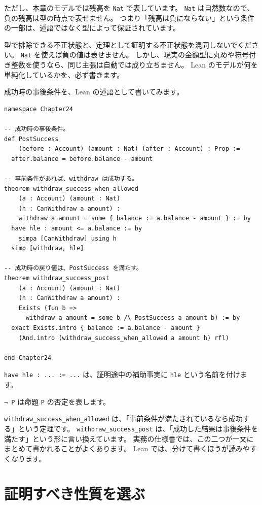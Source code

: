 ただし、本章のモデルでは残高を \texttt{Nat} で表しています。
\texttt{Nat} は自然数なので、負の残高は型の時点で表せません。
つまり「残高は負にならない」という条件の一部は、述語ではなく型によって保証されています。

型で排除できる不正状態と、定理として証明する不正状態を混同しないでください。
\texttt{Nat} を使えば負の値は表せません。
しかし、現実の金額型に丸めや符号付き整数を使うなら、同じ主張は自動では成り立ちません。
Lean のモデルが何を単純化しているかを、必ず書きます。

成功時の事後条件を、Lean の述語として書いてみます。

\begin{listing}[htbp]
\begin{verbatim}
namespace Chapter24

-- 成功時の事後条件。
def PostSuccess
    (before : Account) (amount : Nat) (after : Account) : Prop :=
  after.balance = before.balance - amount

-- 事前条件があれば、withdraw は成功する。
theorem withdraw_success_when_allowed
    (a : Account) (amount : Nat)
    (h : CanWithdraw a amount) :
    withdraw a amount = some { balance := a.balance - amount } := by
  have hle : amount <= a.balance := by
    simpa [CanWithdraw] using h
  simp [withdraw, hle]

-- 成功時の戻り値は、PostSuccess を満たす。
theorem withdraw_success_post
    (a : Account) (amount : Nat)
    (h : CanWithdraw a amount) :
    Exists (fun b =>
      withdraw a amount = some b /\ PostSuccess a amount b) := by
  exact Exists.intro { balance := a.balance - amount }
    (And.intro (withdraw_success_when_allowed a amount h) rfl)

end Chapter24
\end{verbatim}
\caption{\texttt{withdraw\_success\_post}}
\label{lst:ch24-postcondition}
\end{listing}

\texttt{have hle : ... := ...} は、証明途中の補助事実に \texttt{hle} という名前を付けます。

\texttt{¬ P} は命題 \texttt{P} の否定を表します。

\texttt{withdraw\_success\_when\_allowed} は、「事前条件が満たされているなら成功する」という定理です。
\texttt{withdraw\_success\_post} は、「成功した結果は事後条件を満たす」という形に言い換えています。
実務の仕様書では、この二つが一文にまとめて書かれることがよくあります。
Lean では、分けて書くほうが読みやすくなります。

\section{証明すべき性質を選ぶ}

